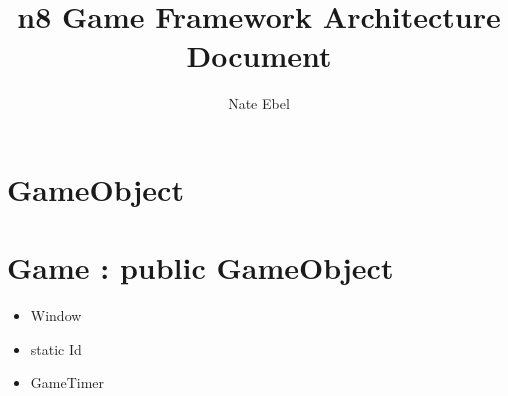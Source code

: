 \documentclass[12pt]{article}
\begin{document}
\title{n8 Game Framework Architecture Document}
\author{Nate Ebel}

\maketitle

\tableofcontents

\section{ GameObject }

\section{ Game : public GameObject}
\begin{itemize}
	\item Window
	\item static Id
	\item GameTimer
\end{itemize}

	
\end{document}
